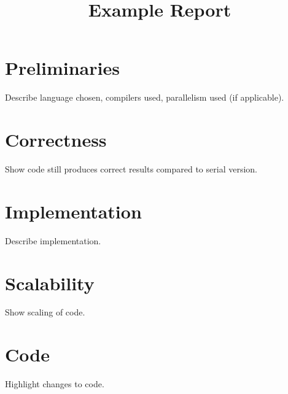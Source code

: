 \documentclass[11pt]{amsart}
\title[OpenMP]{Example Report}
\author[]{}
\begin{document}
\maketitle
\pagestyle{plain}

\section{Preliminaries}\label{sec:prelims}
Describe language chosen, compilers used, parallelism used (if applicable). 

\section{Correctness}\label{sec:correctness}
Show code still produces correct results compared to serial version. 

\section{Implementation}\label{sec:implementation}
Describe implementation.

\section{Scalability}
Show scaling of code. 

\section{Code}
Highlight changes to code. 
\end{document}
